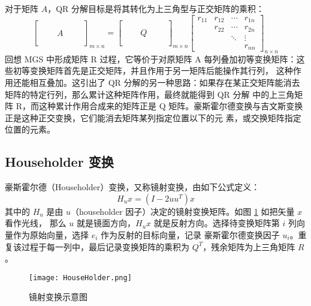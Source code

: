 对于矩阵 $A$，QR 分解目标是将其转化为上三角型与正交矩阵的乘积：
\begin{equation}
    \begin{bmatrix}
        \quad & \quad & \quad \\
        \quad & \quad & \quad \\
        \quad & A     & \quad \\
        \quad & \quad & \quad \\
        \quad & \quad & \quad
    \end{bmatrix}_{m\times n}=
    \begin{bmatrix}
        \quad & \quad & \quad \\
        \quad & \quad & \quad \\
        \quad & Q     & \quad \\
        \quad & \quad & \quad \\
        \quad & \quad & \quad
    \end{bmatrix}_{m\times n}
    \begin{bmatrix}
        r_{11} & r_{12} & \cdots & r_{1n} \\
               & r_{22} & \cdots & r_{2n} \\
               &        & \ddots & \vdots \\
               &
               &        & r_{nn}
    \end{bmatrix}_{n\times n}
\end{equation}
回想 MGS 中形成矩阵 R 过程，它等价于对原矩阵 A 每列叠加初等变换矩阵：这些初等变换矩阵首先是正交矩阵，并且作用于另一矩阵后能操作其行列，
这种作用还能相互叠加。这引出了 QR 分解的另一种思路：如果存在某正交矩阵能消去矩阵的特定行列，那么累计这种矩阵作用，最终就能得到 QR 分解
中的上三角矩阵 R，而这种累计作用合成来的矩阵正是 Q 矩阵。豪斯霍尔德变换与吉文斯变换正是这种正交变换，它们能消去矩阵某列指定位置以下的元
素，或交换矩阵指定位置的元素。

\subsection{Householder 变换}
豪斯霍尔德（Householder）变换，又称镜射变换，由如下公式定义：
\begin{equation}
    H_ux=(I-2uu^{T})x
\end{equation}
其中的 $H_u$ 是由 $u$（householder 因子）决定的镜射变换矩阵。如图 \ref{householder_transform} 如把矢量 $x$ 看作光线，
那么 $u$ 就是镜面方向，$H_ux$ 就是反射方向。选择待变换矩阵第 $i$ 列向量作为原始向量，选择 $e_i$ 作为反射的目标向量，记录
豪斯霍尔德变换因子 $u_i$。重复该过程于每一列中，最后记录变换矩阵的乘积为 $Q^T$，残余矩阵为上三角矩阵 $R$。
\begin{figure}[htbp]
    \centering\label{householder_transform}
    \texttt{[image: HouseHolder.png]}
    \caption{镜射变换示意图}
\end{figure}

